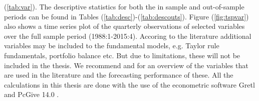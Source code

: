 \documentclass[10pt]{article}
\numberwithin{equation}{section}
\numberwithin{table}{section}
\numberwithin{figure}{section}
\begin{document}
\begin{spacing}{1.5}
(\ref{tab:var}). The descriptive statistics for both the in sample and out-of-sample periods can be found in Tables (\ref{tab:desc})-(\ref{tab:descouts}). Figure (\ref{fig:tspvar}) also shows a time series plot of the quarterly observations of selected variables over the full sample period (1988:1-2015:4). Accoring to the literature additional variables may be included to the fundamental models, e.g. Taylor rule fundamentals, portfolio balance etc. But due to limitations, these will not be included in the thesis. We recommend \cite{rogoff2008continuing} and \cite{rossi2013exchange} for an overview of the variables that are used in the literature and the forecasting performance of these. All the calculations in this thesis are done with the use of the econometric software Gretl \citep{gretl} and PcGive 14.0 \citep{doornik1997pcgive}. \\

\end{spacing}
\end{document}
